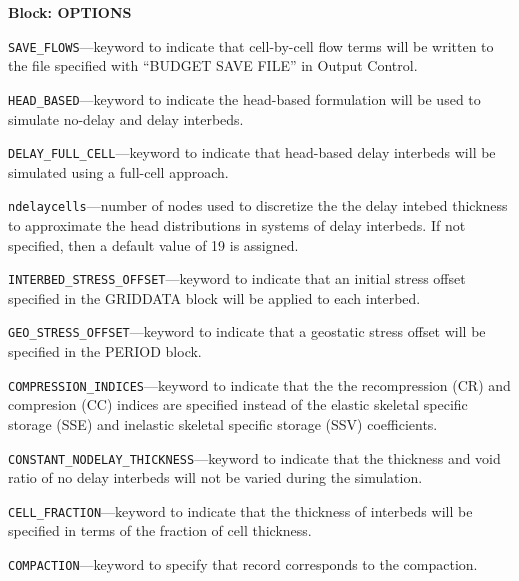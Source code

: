 
\item \textbf{Block: OPTIONS}

\begin{description}
\item \texttt{SAVE\_FLOWS}---keyword to indicate that cell-by-cell flow terms will be written to the file specified with ``BUDGET SAVE FILE'' in Output Control.

\item \texttt{HEAD\_BASED}---keyword to indicate the head-based formulation will be used to simulate no-delay and delay interbeds.

\item \texttt{DELAY\_FULL\_CELL}---keyword to indicate that head-based delay interbeds will be simulated using a full-cell approach.

\item \texttt{ndelaycells}---number of nodes used to discretize the the delay intebed thickness to approximate the head distributions in systems of delay interbeds. If not specified, then a default value of 19 is assigned.

\item \texttt{INTERBED\_STRESS\_OFFSET}---keyword to indicate that an initial stress offset specified in the GRIDDATA block will be applied to each interbed.

\item \texttt{GEO\_STRESS\_OFFSET}---keyword to indicate that a geostatic stress offset will be specified in the PERIOD block.

\item \texttt{COMPRESSION\_INDICES}---keyword to indicate that the the recompression (CR) and compresion (CC) indices are specified instead of the elastic skeletal specific storage (SSE) and inelastic skeletal specific storage (SSV) coefficients.

\item \texttt{CONSTANT\_NODELAY\_THICKNESS}---keyword to indicate that the thickness and void ratio of no delay interbeds will not be varied during the simulation.

\item \texttt{CELL\_FRACTION}---keyword to indicate that the thickness of interbeds will be specified in terms of the fraction of cell thickness.

\item \texttt{COMPACTION}---keyword to specify that record corresponds to the compaction.


\end{description}
